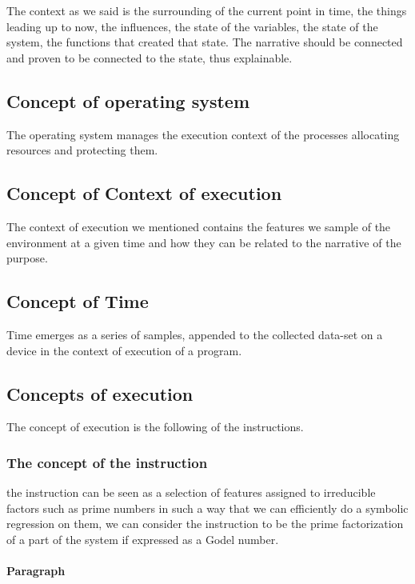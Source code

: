 \documentclass{article}
\begin{document}
The context as we said is the surrounding of the current point in time,
the things leading up to now, the influences, the state of the  variables,
the state of the system, the functions that created that state. The narrative should be connected and proven to be connected to the state, thus explainable.

\subsection{Concept of operating system}
The operating system manages the execution context of the processes
allocating resources and protecting them.

\subsection{Concept of Context of execution}

The context of execution we mentioned contains the features we sample of the
environment at a given time and how they can be related to the narrative of the purpose.

\subsection{Concept of Time}

Time emerges as a series of samples, appended to the collected data-set
on a device in the context of execution of a program.

\subsection{Concepts of execution}
The concept of execution is the following of
the instructions.

\subsubsection{The concept of the instruction}
the instruction can be seen as a selection of features assigned to irreducible factors such as prime numbers in such a way that we can efficiently do a symbolic regression on them, we can consider the instruction to be the prime factorization of a part of the system if expressed as a Godel number.

\paragraph{Paragraph}
\end{document}
